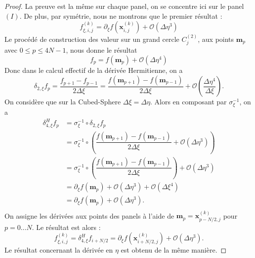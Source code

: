 \begin{proof}
La preuve est la même sur chaque panel, on se concentre ici sur le panel $(I)$. De plus, par symétrie, nous ne montrons que le premier résultat :
\begin{equation}
f_{\xi,i,j}^{(k)} = \partial_{\xi} f(\mathbf{x}_{i,j}^{(k)}) + \mathcal{O}(\Delta \eta^3)
\end{equation}
Le procédé de construction des valeur sur un grand cercle $C_j^{(2)}$, aux points $\mathbf{m}_p$ avec $0 \leq p \leq 4N-1$, nous donne le résultat
\begin{equation}
f_p = f(\mathbf{m}_p) + \mathcal{O}(\Delta \eta^4)
\end{equation}
Donc dans le calcul effectif de la dérivée Hermitienne, on a 
\begin{equation}
\delta_{2,\xi} f_p = \dfrac{f_{p+1} - f_{p-1}}{2 \Delta \xi} = \dfrac{f(\mathbf{m}_{p+1}) - f(\mathbf{m}_{p-1})}{2 \Delta \xi} + \mathcal{O}\left( \dfrac{\Delta \eta^4}{\Delta \xi} \right).
\end{equation}
On considère que sur la Cubed-Sphere $\Delta \xi = \Delta \eta$. Alors en composant par $\sigma_{\xi}^{-1}$, on a 
\begin{align*}
\delta_{4,\xi}^H f_p & = \sigma_{\xi}^{-1} \circ \delta_{2,\xi} f_p \\
                   & = \sigma_{\xi}^{-1} \circ \left( \dfrac{f(\mathbf{m}_{p+1}) - f(\mathbf{m}_{p-1})}{2 \Delta \xi} + \mathcal{O}\left( \Delta \eta^3 \right) \right)\\
                   & = \sigma_{\xi}^{-1} \circ \left( \dfrac{f(\mathbf{m}_{p+1}) - f(\mathbf{m}_{p-1})}{2 \Delta \xi}\right)  + \mathcal{O}\left( \Delta \eta^3 \right) \\
                   & = \partial_{\xi}f(\mathbf{m}_p) + \mathcal{O}\left( \Delta \eta^3 \right) + \mathcal{O}\left( \Delta \xi^4 \right) \\
                   & = \partial_{\xi}f(\mathbf{m}_p) + \mathcal{O}\left( \Delta \eta^3 \right).\\
\end{align*}
On assigne les dérivées aux points des panels à l'aide de $\mathbf{m}_p=\mathbf{x}^{(k)}_{p-N/2,j}$ pour $p = 0 \ldots N$. Le résultat est alors :
\begin{equation}
f^{(k)}_{\xi,i,j} = \delta_{4,\xi}^H f_{i+N/2} = \partial_{\xi} f(\mathbf{x}^{(k)}_{i+N/2,j}) + \mathcal{O}\left( \Delta \eta^3 \right).
\end{equation}
Le résultat concernant la dérivée en $\eta$ est obtenu de la même manière.
\end{proof}

